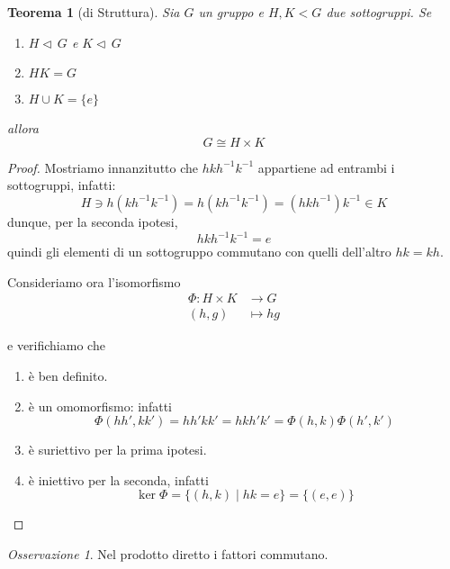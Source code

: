 \documentclass[a4paper]{article}
\newtheorem{theorem}{Teorema}[section]
\theoremstyle{remark}
\newtheorem*{remark}{Osservazione}
\theoremstyle{definition}
\newcommand{\fun}[5]{
	\begin{align*}
	#1 \colon #2 &\to #3 \\
	#4 &\mapsto #5
	\end{align*}
}
\begin{document}
\begin{multicols}{2}



\begin{theorem}[di Struttura]{\label{struttura}}
	Sia $ G $ un gruppo e $ H, K < G $ due sottogruppi. Se
	\begin{enumerate}
		\item $ H \lhd\, G $   e   $ K \lhd\, G $
		\item $ HK = G $
		\item $ H \cup K = \{e\} $
	\end{enumerate}
allora $$  G \cong H \times K  $$
\end{theorem}
\begin{proof}
	Mostriamo innanzitutto che $ hkh^{-1}k^{-1} $ appartiene ad entrambi i sottogruppi, infatti:
	\[ H  \ni h(kh^{-1}k^{-1}) = h(kh^{-1}k^{-1}) = (hkh^{-1})k^{-1} \in K \]
	dunque, per la seconda ipotesi, $$ hkh^{-1}k^{-1} = e $$ quindi gli elementi di un sottogruppo commutano con quelli dell'altro $ hk = kh $.
	
	Consideriamo ora l'isomorfismo \fun{\Phi}{H\times K}{G}{(h,g)}{hg}
	e verifichiamo che
	\begin{enumerate}
		\item è ben definito.
		\item è un omomorfismo: infatti \[ \Phi(hh', kk') = hh'kk' = hkh'k' = \Phi(h, k)\Phi(h',k') \]
		\item è suriettivo per la prima ipotesi.
		\item è iniettivo per la seconda, infatti \[ \ker\Phi = \{ (h, k) \mid hk = e \} = \{ (e, e) \} \]
	\end{enumerate}
\end{proof}

\begin{remark}
	Nel prodotto diretto i fattori commutano.
\end{remark}


\end{multicols}
\end{document}
